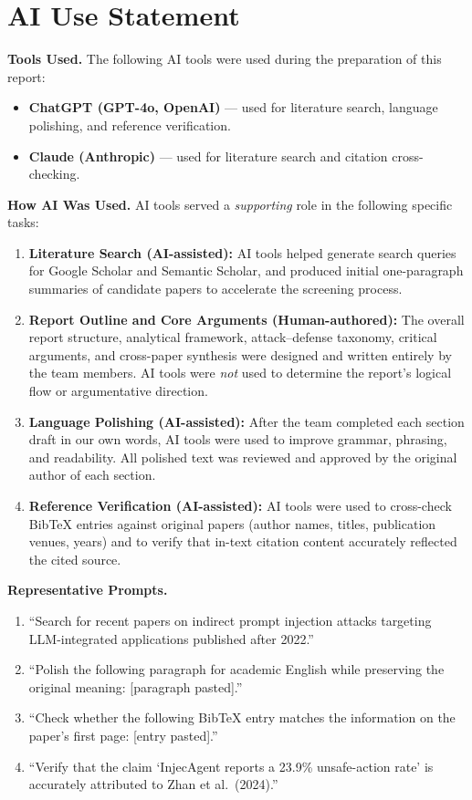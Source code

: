 \section*{AI Use Statement}

\textbf{Tools Used.}
The following AI tools were used during the preparation of this report:
\begin{itemize}[nosep]
  \item \textbf{ChatGPT (GPT-4o, OpenAI)} --- used for literature search, language polishing, and reference verification.
  \item \textbf{Claude (Anthropic)} --- used for literature search and citation cross-checking.
\end{itemize}

\textbf{How AI Was Used.}
AI tools served a \emph{supporting} role in the following specific tasks:

\begin{enumerate}[nosep]
  \item \textbf{Literature Search (AI-assisted):} AI tools helped generate search queries for Google Scholar and Semantic Scholar, and produced initial one-paragraph summaries of candidate papers to accelerate the screening process.
  \item \textbf{Report Outline and Core Arguments (Human-authored):} The overall report structure, analytical framework, attack--defense taxonomy, critical arguments, and cross-paper synthesis were designed and written entirely by the team members. AI tools were \emph{not} used to determine the report's logical flow or argumentative direction.
  \item \textbf{Language Polishing (AI-assisted):} After the team completed each section draft in our own words, AI tools were used to improve grammar, phrasing, and readability. All polished text was reviewed and approved by the original author of each section.
  \item \textbf{Reference Verification (AI-assisted):} AI tools were used to cross-check BibTeX entries against original papers (author names, titles, publication venues, years) and to verify that in-text citation content accurately reflected the cited source.
\end{enumerate}

\textbf{Representative Prompts.}
\begin{enumerate}[nosep]
  \item ``Search for recent papers on indirect prompt injection attacks targeting LLM-integrated applications published after 2022.''
  \item ``Polish the following paragraph for academic English while preserving the original meaning: [paragraph pasted].''
  \item ``Check whether the following BibTeX entry matches the information on the paper's first page: [entry pasted].''
  \item ``Verify that the claim `InjecAgent reports a 23.9\% unsafe-action rate' is accurately attributed to Zhan et al.\ (2024).''
\end{enumerate}

